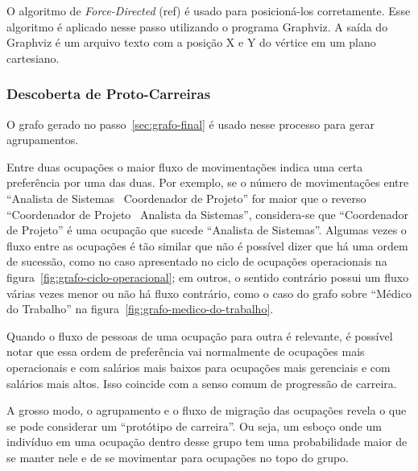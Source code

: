 \documentclass[12pt,a4paper]{article}
\theoremstyle{hypo}
\begin{document}
O algoritmo de \textit{Force-Directed} (ref) é usado para posicioná-los corretamente. Esse algoritmo é aplicado nesse passo utilizando o programa Graphviz. A saída do Graphviz é um arquivo texto com a posição X e Y do vértice em um plano cartesiano.

\subsubsection{Descoberta de Proto-Carreiras}



O grafo gerado no passo~\ref{sec:grafo-final} é usado nesse processo para gerar agrupamentos.

Entre duas ocupações o maior fluxo de movimentações indica uma certa preferência por uma das duas. Por exemplo, se o número de movimentações entre \enquote{Analista de Sistemas \textrightarrow~Coordenador de Projeto} for maior que o reverso \enquote{Coordenador de Projeto \textrightarrow~Analista da Sistemas}, considera-se que \enquote{Coordenador de Projeto} é uma ocupação que sucede \enquote{Analista de Sistemas}. Algumas vezes o fluxo entre as ocupações é tão similar que não é possível dizer que há uma ordem de sucessão, como no caso apresentado no ciclo de ocupações operacionais na figura~\ref{fig:grafo-ciclo-operacional}; em outros, o sentido contrário possui um fluxo várias vezes menor ou não há fluxo contrário, como o caso do grafo sobre \enquote{Médico do Trabalho} na figura~\ref{fig:grafo-medico-do-trabalho}.


Quando o fluxo de pessoas de uma ocupação para outra é relevante, é possível notar que essa ordem de preferência vai normalmente de ocupações mais operacionais e com salários mais baixos para ocupações mais gerenciais e com salários mais altos. Isso coincide com a senso comum de progressão de carreira.

A grosso modo, o agrupamento e o fluxo de migração das ocupações revela o que se pode considerar um \enquote{protótipo de carreira}. Ou seja, um esboço onde um indivíduo em uma ocupação dentro desse grupo tem uma probabilidade maior de se manter nele e de se movimentar para ocupações no topo do grupo.
\end{document}
